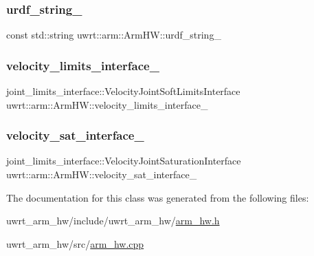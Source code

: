 \subsubsection{\texorpdfstring{urdf\+\_\+string\+\_\+}{urdf\_string\_}}
{\footnotesize\ttfamily const std\+::string uwrt\+::arm\+::\+Arm\+H\+W\+::urdf\+\_\+string\+\_\+\hspace{0.3cm}{\ttfamily [protected]}}

\mbox{\label{classuwrt_1_1arm_1_1_arm_h_w_a8e2811fbe4adfcbcce9efbee3756ea8f}} 
\subsubsection{\texorpdfstring{velocity\+\_\+limits\+\_\+interface\+\_\+}{velocity\_limits\_interface\_}}
{\footnotesize\ttfamily joint\+\_\+limits\+\_\+interface\+::\+Velocity\+Joint\+Soft\+Limits\+Interface uwrt\+::arm\+::\+Arm\+H\+W\+::velocity\+\_\+limits\+\_\+interface\+\_\+\hspace{0.3cm}{\ttfamily [protected]}}

\mbox{\label{classuwrt_1_1arm_1_1_arm_h_w_a461fd5b0255bf2d1eecfb384ff7f1987}} 
\subsubsection{\texorpdfstring{velocity\+\_\+sat\+\_\+interface\+\_\+}{velocity\_sat\_interface\_}}
{\footnotesize\ttfamily joint\+\_\+limits\+\_\+interface\+::\+Velocity\+Joint\+Saturation\+Interface uwrt\+::arm\+::\+Arm\+H\+W\+::velocity\+\_\+sat\+\_\+interface\+\_\+\hspace{0.3cm}{\ttfamily [protected]}}



The documentation for this class was generated from the following files\+:\begin{DoxyCompactItemize}
\item 
uwrt\+\_\+arm\+\_\+hw/include/uwrt\+\_\+arm\+\_\+hw/\hyperlink{arm__hw_8h}{arm\+\_\+hw.\+h}\item 
uwrt\+\_\+arm\+\_\+hw/src/\hyperlink{arm__hw_8cpp}{arm\+\_\+hw.\+cpp}\end{DoxyCompactItemize}
